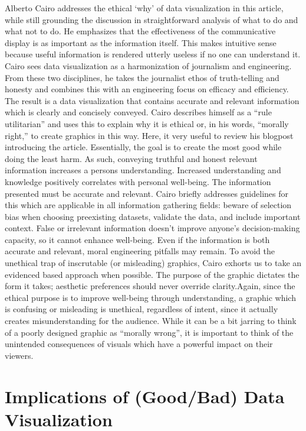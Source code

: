 \documentclass[]{book}
\theoremstyle{definition}
\theoremstyle{definition}
\theoremstyle{definition}
\theoremstyle{remark}
\begin{document}
\citep{ethical_infographics}

Alberto Cairo addresses the ethical `why' of data visualization in this
article, while still grounding the discussion in straightforward
analysis of what to do and what not to do. He emphasizes that the
effectiveness of the communicative display is as important as the
information itself. This makes intuitive sense because useful
information is rendered utterly useless if no one can understand it.
Cairo sees data visualization as a harmonization of journalism and
engineering. From these two disciplines, he takes the journalist ethos
of truth-telling and honesty and combines this with an engineering focus
on efficacy and efficiency. The result is a data visualization that
contains accurate and relevant information which is clearly and
concisely conveyed. Cairo describes himself as a ``rule utilitarian''
and uses this to explain why it is ethical or, in his words, ``morally
right,'' to create graphics in this way. Here, it very useful to review
his blogpost introducing the article. Essentially, the goal is to create
the most good while doing the least harm. As such, conveying truthful
and honest relevant information increases a persons understanding.
Increased understanding and knowledge positively correlates with
personal well-being. The information presented must be accurate and
relevant. Cairo briefly addresses guidelines for this which are
applicable in all information gathering fields: beware of selection bias
when choosing preexisting datasets, validate the data, and include
important context. False or irrelevant information doesn't improve
anyone's decision-making capacity, so it cannot enhance well-being. Even
if the information is both accurate and relevant, moral engineering
pitfalls may remain. To avoid the unethical trap of inscrutable (or
misleading) graphics, Cairo exhorts us to take an evidenced based
approach when possible. The purpose of the graphic dictates the form it
takes; aesthetic preferences should never override clarity.Again, since
the ethical purpose is to improve well-being through understanding, a
graphic which is confusing or misleading is unethical, regardless of
intent, since it actually creates misunderstanding for the audience.
While it can be a bit jarring to think of a poorly designed graphic as
``morally wrong'', it is important to think of the unintended
consequences of visuals which have a powerful impact on their viewers.

\section{Implications of (Good/Bad) Data
Visualization}\label{implications-of-goodbad-data-visualization}
\end{document}
